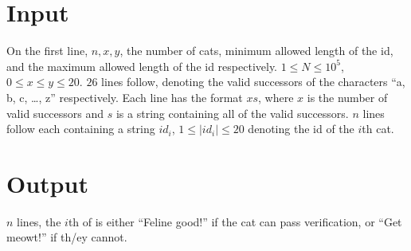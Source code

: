 \section*{Input}
On the first line, $n, x, y$, the number of cats, minimum allowed length of the id, and the maximum allowed length of the id respectively. $1 \leq N \leq 10^5$, $0 \leq x \leq y \leq 20$.
$26$ lines follow, denoting the valid successors of the characters ``a, b, c, \ldots, z'' respectively. Each line has the format $x s$, where $x$ is the number of valid successors and $s$ is a string containing all of the valid successors.
$n$ lines follow each containing a string $id_i$, $1 \leq |id_i| \leq 20$ denoting the id of the $i$th cat.

\section*{Output}
$n$ lines, the $i$th of is either ``Feline good!'' if the cat can pass verification, or ``Get meowt!'' if th/ey cannot.
